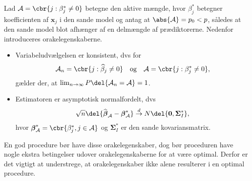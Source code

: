 Lad $\mathcal{A} =\cbr{j:\beta_j^* \neq 0}$ betegne den aktive mængde, hvor $\beta_j^*$ betegner koefficienten af $\mathbf{x}_j$ i den sande model og antag at $\abs{ \mathcal{A}}=p_0 <p$, således at den sande model blot afhænger af en delmængde af prædiktorerne.
Nedenfor introduceres orakelegenskaberne. 
\begin{defn}[Orakelegenskaber]
\begin{itemize}
\item Variabeludvælgelsen er konsistent, dvs for
\begin{align*}
\mathcal{A}_n=\cbr{ j :\widehat{\beta}_j \neq 0} \quad \text{og} \quad \mathcal{A} =\cbr{j:\beta_j^* \neq 0},
\end{align*}
gælder der, at $\lim_{n \rightarrow \infty }P\del{\mathcal{A}_n=\mathcal{A}}=1$.
\item Estimatoren er asymptotisk normalfordelt, dvs
\begin{align*}
\sqrt{n}\del{\widehat{\boldsymbol{\beta}}_\mathcal{A}-\boldsymbol{\beta}^*_\mathcal{A}} \overset{d}{\rightarrow} N \del{\mathbf{0}, \boldsymbol{\Sigma}^*_I},
\end{align*}
hvor $\boldsymbol{\beta}^*_\mathcal{A}=\cbr{ \beta_j^*, j \in \mathcal{A}}$ og $\boldsymbol{\Sigma}^*_I$ er den sande kovariansmatrix.
\end{itemize}
\end{defn}
En god procedure bør have disse orakelegenskaber, dog bør proceduren have nogle ekstra betingelser udover orakelegenskaberne for at være optimal.
Derfor er det vigtigt at understrege, at orakelegenskaber ikke alene resulterer i en optimal procedure.